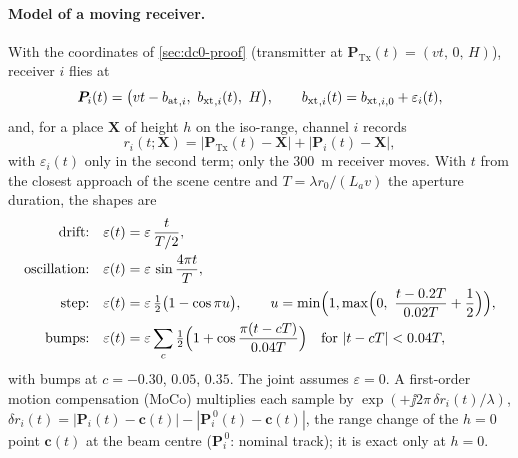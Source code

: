\paragraph{Model of a moving receiver.} With the coordinates of \cref{sec:dc0-proof} (transmitter at
$\bm P_{\mathrm{Tx}}(t)=(vt,\,0,\,H)$), receiver $i$ flies at
\begin{equation}
  \bm P_i(t)=\bigl(vt-\bat_{,i},\ \bxt_{,i}(t),\ H\bigr),\qquad \bxt_{,i}(t)=\bxt_{,i,0}+\varepsilon_i(t),
  \label{eq:tvtrack}
\end{equation}
and, for a place $\bm X$ of height $h$ on the iso-range, channel $i$ records
\begin{equation}
  r_i(t;\bm X)=\bigl|\bm P_{\mathrm{Tx}}(t)-\bm X\bigr|+\bigl|\bm P_i(t)-\bm X\bigr| ,
\end{equation}
with $\varepsilon_i(t)$ only in the second term; only the \SI{300}{m} receiver moves. With $t$ from the closest approach of the
scene centre and $T=\lambda r_0/(L_a v)$ the aperture duration, the shapes are
\begin{align*}
  \text{drift:}\quad & \varepsilon(t)=\varepsilon\,\frac{t}{T/2},\\
  \text{oscillation:}\quad & \varepsilon(t)=\varepsilon\,\sin\frac{4\pi t}{T},\\
  \text{step:}\quad & \varepsilon(t)=\varepsilon\,\tfrac12\bigl(1-\cos\pi u\bigr),\qquad u=\min\Bigl(1,\max\Bigl(0,\ \frac{t-0.2T}{0.02T}+\frac12\Bigr)\Bigr),\\
  \text{bumps:}\quad & \varepsilon(t)=\varepsilon\sum_{c}\tfrac12\Bigl(1+\cos\frac{\pi(t-cT)}{0.04T}\Bigr)\quad\text{for }|t-cT|<0.04T,
\end{align*}
with bumps at $c=-0.30$, $0.05$, $0.35$. The joint assumes $\varepsilon=0$. A first-order motion compensation (MoCo)
multiplies each sample by $\exp(+\jj 2\pi\,\delta r_i(t)/\lambda)$, $\delta r_i(t)=|\bm P_i(t)-\bm c(t)|-|\bm P_i^{\,0}(t)-\bm c(t)|$,
the range change of the $h=0$ point $\bm c(t)$ at the beam centre ($\bm P_i^{\,0}$: nominal track); it is exact only at $h=0$.

